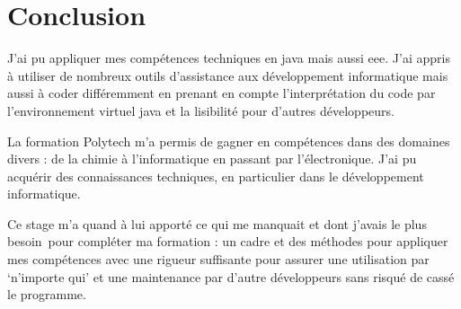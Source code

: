 \documentclass[french,a4paper,12pt]{report}
\begin{document}
\chapter{Conclusion}

J’ai pu appliquer mes compétences techniques en java mais aussi eee. J’ai appris à utiliser de nombreux outils d’assistance aux développement informatique mais aussi à coder différemment en prenant en compte l’interprétation du code par l'environnement virtuel java et la lisibilité pour d'autres développeurs.

La formation Polytech m’a permis de gagner en compétences dans des domaines divers : de la chimie à l’informatique en passant par l’électronique. J’ai pu acquérir des connaissances techniques, en particulier dans le développement informatique.

Ce stage m’a quand à lui apporté ce qui me manquait et dont j’avais le plus besoin pour compléter ma formation : un cadre et des méthodes pour appliquer mes compétences avec une rigueur suffisante pour assurer une utilisation par ‘n’importe qui’ et une maintenance par d’autre développeurs sans risqué de cassé le programme.
\end{document}
